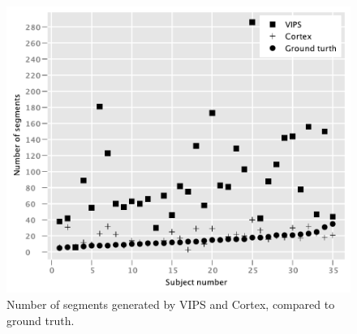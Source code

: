 \begin{figure}
    \includegraphics[trim=0 0 0 0,clip,scale=0.56]{figures/results-and-discussion/number-of-segments-fig.pdf}
    \caption{Number of segments generated by VIPS and Cortex, compared to ground truth.}
    \label{fig:number-of-segments}
\end{figure}
